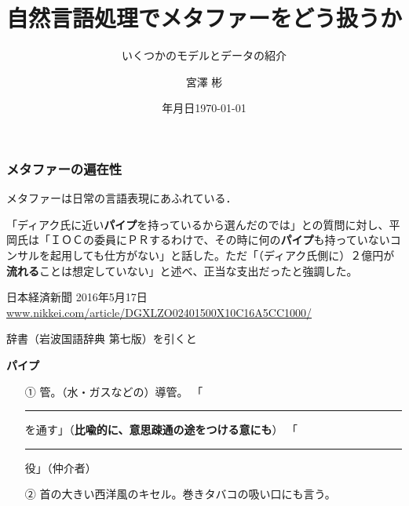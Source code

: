 \documentclass[11pt]{beamer}
\title{自然言語処理でメタファーをどう扱うか}
\subtitle{いくつかのモデルとデータの紹介}
\institute{総研大/NII 宮尾研究室 博士前期2年}
\author{宮澤 彬}
\date{{\number\year}年{\number\month}月{\number\day}日}
\date{\today}
\newcommand{\ten}{、}
\newcommand{\maru}{。}
\newcommand{\zenkakudash}{\hspace{.6pt}\rule[3.2pt]{13pt}{.5pt}\hspace{.6pt}}
\newcommand\metaphorical[1]{\textcolor{sRed}{\textbf{#1}}}
\begin{document}
\begin{frame}
    \nocite{shutovaphdthesis}
    \maketitle
\end{frame}

\begin{frame}
\frametitle{メタファーの遍在性}
メタファーは日常の言語表現にあふれている．
{%
    \footnotesize
    \begin{leftbar}
        「ディアク氏に近い\metaphorical{パイプ}を持っているから選んだのでは」との質問に対し、平岡氏は「ＩＯＣの委員にＰＲするわけで、その時に何の\metaphorical{パイプ}も持っていないコンサルを起用しても仕方がない」と話した。ただ「（ディアク氏側に）２億円が\metaphorical{流れる}ことは想定していない」と述べ、正当な支出だったと強調した。

        日本経済新聞 2016年5月17日
    \url{www.nikkei.com/article/DGXLZO02401500X10C16A5CC1000/}
    \end{leftbar}

}
辞書（岩波国語辞典 第七版）を引くと
{%
    \footnotesize
    \begin{leftbar}
    \textbf{パイプ}
    \vspace{-\topsep}
    \begin{enumerate}
        \item[①] 管{\maru}（水・ガスなどの）導管{\maru}
            「{\zenkakudash}を通す」（\metaphorical{比喩的に{\ten}意思疎通の途をつける意にも}）
            「{\zenkakudash}役」（仲介者）
        \item[②] 首の大きい西洋風のキセル{\maru}巻きタバコの吸い口にも言う{\maru}
    \end{enumerate}
    \end{leftbar}
}
\end{frame}
\end{document}
